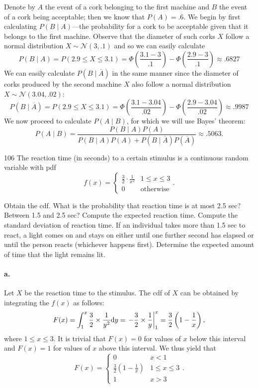 \documentclass{exam}
\newcommand{\paren}[1]{\left(#1\right)}
\begin{document}
Denote by $A$ the event of a cork belonging to the first machine and $B$ the event of a cork being acceptable; then we know that $P(A) = .6$. We begin by first calculating $P(B \mid A)$---the probability for a cork to be acceptable given that it belongs to the first machine. Observe that the diameter of such corks $X$ follow a normal distribution $X \sim \mathcal N(3, .1)$ and so we can easily calculate
\[
	P(B \mid A) = P(2.9 \le X \le 3.1) = \Phi\paren{\frac{3.1 - 3}{.1}} - \Phi\paren{\frac{2.9 - 3}{.1}} \approx .6827
\]
We can easily calculate $P(B \mid \overline A)$ in the same manner since the diameter of corks produced by the second machine $X$ also follow a normal distribution $X \sim \mathcal N(3.04, .02)$:
\[
	P(B \mid \overline A) = P(2.9 \le X \le 3.1) = \Phi\paren{\frac{3.1 - 3.04}{.02}} - \Phi\paren{\frac{2.9 - 3.04}{.02}} \approx .9987
\]
We now proceed to calculate $P(A \mid B)$, for which we will use Bayes' theorem:
\[
	P(A \mid B) = \frac{P(B \mid A)P(A)}{P(B \mid A)P(A) + P(B \mid \overline A)P(\overline A)} \approx .5063.
\]

\begin{problem}{106}
	The reaction time (in seconds) to a certain stimulus is a continuous random variable with pdf
	\[
		f(x) = \begin{cases}
			\displaystyle \frac32 \cdot \frac1{x^2} & 1 \le x \le 3 \\
			0 & \text{otherwise}
		\end{cases}.
	\]
	\begin{tasks}[label=\textbf{\alph*.}]
		\task Obtain the cdf.
		\task What is the probability that reaction time is at most 2.5 sec? Between 1.5 and 2.5 sec?
		\task Compute the expected reaction time.
		\task Compute the standard deviation of reaction time.
		\task If an individual takes more than 1.5 sec to react, a light comes on and stays on either until one further second has elapsed or until the person reacts (whichever happens first). Determine the expected amount of time that the light remains lit.
	\end{tasks}
\end{problem}

\paragraph{a.} Let $X$ be the reaction time to the stimulus. The cdf of $X$ can be obtained by integrating the $f(x)$ as follows:
\[
	F(x) = \int_1^x \frac32 \times \frac1{y^2}\dd y = \eval{-\frac32 \times \frac1y}_1^x = \frac32\paren{1 - \frac1x},
\]
where $1 \le x \le 3$. It is trivial that $F(x) = 0$ for values of $x$ below this interval and $F(x) = 1$ for values of $x$ above this interval. We thus yield that
\[
	F(x) = \begin{cases}
		0 & x < 1 \\
		\displaystyle \frac32\paren{1 - \frac1x} & 1 \le x \le 3 \\
		1 & x > 3
	\end{cases}.
\]
\end{document}
